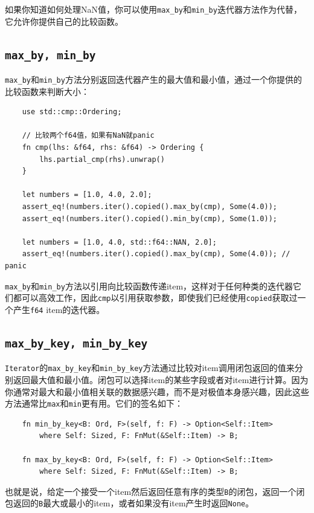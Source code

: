 如果你知道如何处理NaN值，你可以使用\texttt{max\_by}和\texttt{min\_by}迭代器方法作为代替，它允许你提供自己的比较函数。

\subsection{\texttt{max\_by, min\_by}}\label{MaxKey}
\texttt{max\_by}和\texttt{min\_by}方法分别返回迭代器产生的最大值和最小值，通过一个你提供的比较函数来判断大小：
\begin{verbatim}
    use std::cmp::Ordering;

    // 比较两个f64值，如果有NaN就panic
    fn cmp(lhs: &f64, rhs: &f64) -> Ordering {
        lhs.partial_cmp(rhs).unwrap()
    }
    
    let numbers = [1.0, 4.0, 2.0];
    assert_eq!(numbers.iter().copied().max_by(cmp), Some(4.0));
    assert_eq!(numbers.iter().copied().min_by(cmp), Some(1.0));

    let numbers = [1.0, 4.0, std::f64::NAN, 2.0];
    assert_eq!(numbers.iter().copied().max_by(cmp), Some(4.0)); // panic
\end{verbatim}

\texttt{max\_by}和\texttt{min\_by}方法以引用向比较函数传递item，这样对于任何种类的迭代器它们都可以高效工作，因此\texttt{cmp}以引用获取参数，即使我们已经使用\texttt{copied}获取过一个产生\texttt{f64} item的迭代器。

\subsection{\texttt{max\_by\_key, min\_by\_key}}
\texttt{Iterator}的\texttt{max\_by\_key}和\texttt{min\_by\_key}方法通过比较对item调用闭包返回的值来分别返回最大值和最小值。闭包可以选择item的某些字段或者对item进行计算。因为你通常对最大和最小值相关联的数据感兴趣，而不是对极值本身感兴趣，因此这些方法通常比\texttt{max}和\texttt{min}更有用。它们的签名如下：
\begin{verbatim}
    fn min_by_key<B: Ord, F>(self, f: F) -> Option<Self::Item>
        where Self: Sized, F: FnMut(&Self::Item) -> B;

    fn max_by_key<B: Ord, F>(self, f: F) -> Option<Self::Item>
        where Self: Sized, F: FnMut(&Self::Item) -> B;
\end{verbatim}

也就是说，给定一个接受一个item然后返回任意有序的类型\texttt{B}的闭包，返回一个闭包返回的\texttt{B}最大或最小的item，或者如果没有item产生时返回\texttt{None}。

